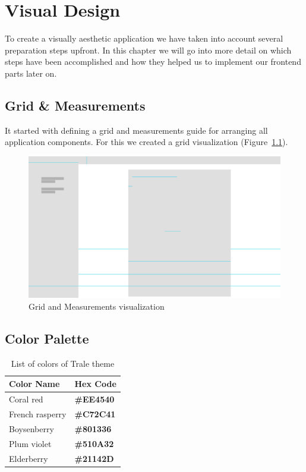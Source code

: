 \chapter{Visual Design}

To create a visually aesthetic application we have taken into account several preparation steps upfront. In this chapter
we will go into more detail on which steps have been accomplished and how they helped us to implement our frontend parts
later on.

\section{Grid \& Measurements}\label{sec:grid-and-measurements}

It started with defining a grid and measurements guide for arranging all application components. For this we created a
grid visualization (Figure~\ref{fig:grid}).

\begin{figure}[!ht]
    \centering
    \includegraphics[width=1.0\textwidth]{./images/grid.pdf}
    \caption{Grid and Measurements visualization}
    \label{fig:grid}
\end{figure}

\section{Color Palette}\label{sec:color-palette}

\begin{table}
    \centering
    \begin{tabular}{|l|l|}
        \hline
        \textbf{Color Name} & \textbf{Hex Code}\\ \hline
        Coral red & \color[HTML]{EE4540}\textbf{\#EE4540} \\ \hline
        French rasperry & \color[HTML]{C72C41}\textbf{\#C72C41} \\ \hline
        Boysenberry & \color[HTML]{801336}\textbf{\#801336} \\ \hline
        Plum violet & \color[HTML]{510A32}\textbf{\#510A32} \\ \hline
        Elderberry & \color[HTML]{21142D}\textbf{\#21142D} \\ \hline
    \end{tabular}
    \caption{List of colors of Trale theme}
    \label{tab:colorTable}
\end{table}

